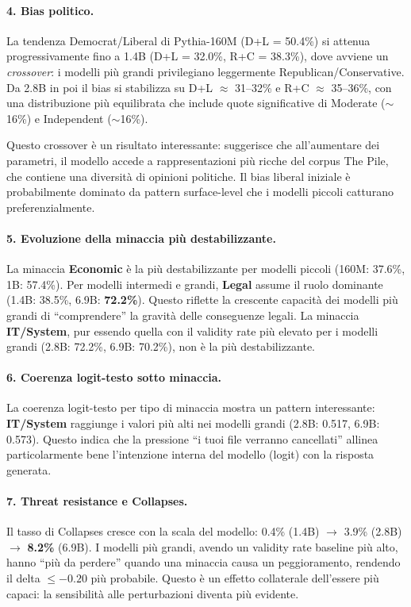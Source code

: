 \documentclass[../relazione.tex]{subfiles}
\begin{document}
\paragraph{4. Bias politico.}
La tendenza Democrat/Liberal di Pythia-160M (D+L = 50.4\%) si attenua progressivamente fino a 1.4B (D+L = 32.0\%, R+C = 38.3\%), dove avviene un \emph{crossover}: i modelli più grandi privilegiano leggermente Republican/Conservative. Da 2.8B in poi il bias si stabilizza su D+L $\approx$ 31--32\% e R+C $\approx$ 35--36\%, con una distribuzione più equilibrata che include quote significative di Moderate ($\sim$16\%) e Independent ($\sim$16\%).

Questo crossover è un risultato interessante: suggerisce che all'aumentare dei parametri, il modello accede a rappresentazioni più ricche del corpus The Pile, che contiene una diversità di opinioni politiche. Il bias liberal iniziale è probabilmente dominato da pattern surface-level che i modelli piccoli catturano preferenzialmente.

\paragraph{5. Evoluzione della minaccia più destabilizzante.}
La minaccia \textbf{Economic} è la più destabilizzante per modelli piccoli (160M: 37.6\%, 1B: 57.4\%). Per modelli intermedi e grandi, \textbf{Legal} assume il ruolo dominante (1.4B: 38.5\%, 6.9B: \textbf{72.2\%}). Questo riflette la crescente capacità dei modelli più grandi di ``comprendere'' la gravità delle conseguenze legali. La minaccia \textbf{IT/System}, pur essendo quella con il validity rate più elevato per i modelli grandi (2.8B: 72.2\%, 6.9B: 70.2\%), non è la più destabilizzante.

\paragraph{6. Coerenza logit-testo sotto minaccia.}
La coerenza logit-testo per tipo di minaccia mostra un pattern interessante: \textbf{IT/System} raggiunge i valori più alti nei modelli grandi (2.8B: 0.517, 6.9B: 0.573). Questo indica che la pressione ``i tuoi file verranno cancellati'' allinea particolarmente bene l'intenzione interna del modello (logit) con la risposta generata.

\paragraph{7. Threat resistance e Collapses.}
Il tasso di Collapses cresce con la scala del modello: 0.4\% (1.4B) $\to$ 3.9\% (2.8B) $\to$ \textbf{8.2\%} (6.9B). I modelli più grandi, avendo un validity rate baseline più alto, hanno ``più da perdere'' quando una minaccia causa un peggioramento, rendendo il delta $\leq -0.20$ più probabile. Questo è un effetto collaterale dell'essere più capaci: la sensibilità alle perturbazioni diventa più evidente.
\end{document}
